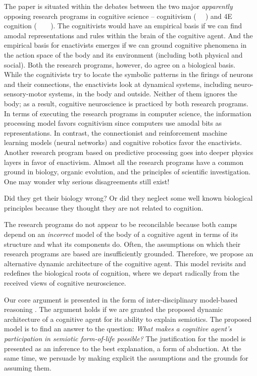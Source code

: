 The paper is situated within the debates between the two major \textit{apparently} opposing research programs in cognitive science – cognitivism (\cite{chomsky}~ \cite{fodor_modularity_1983}~\cite{pinker}) and 4E cognition (\cite{gibson1991ecological}~\cite{Merleau-Ponty2013-vs}~\cite{varela}~\cite{maturana1991autopoiesis}~\cite{noe_action_2004}). The cognitivists would have an empirical basis if we can find amodal representations and rules within the brain of the cognitive agent. And the empirical basis for enactivists emerges if we can ground cognitive phenomena in the action space of the body and its environment (including both physical and social). Both the research programs, however, do agree on a biological basis. While the cognitivists try to locate the symbolic patterns in the firings of neurons and their connections, the enactivists look at dynamical systems, including neuro-sensory-motor systems, in the body and outside. Neither of them ignores the body; as a result, cognitive neuroscience is practiced by both research programs. In terms of executing the research programs in computer science, the information processing model favors cognitivism since computers use amodal bits as representations. In contrast, the connectionist and reinforcement machine learning models (neural networks) and cognitive robotics favor the enactivists.
Another research program based on predictive processing goes into deeper physics layers in favor of enactivism. Almost all the research programs have a common ground in biology, organic evolution, and the principles of scientific investigation. One may wonder why serious disagreements still exist! 

Did they get their biology wrong? Or did they neglect some well known biological principles because they thought they are not related to cognition. 

The research programs do not appear to be reconcilable because both camps depend on an \textit{incorrect} model of the body of a cognitive agent in terms of its structure and what its components do.  Often, the assumptions on which their research programs are based are insufficiently grounded. Therefore, we propose an alternative dynamic architecture of the cognitive agent. This model revisits and redefines the biological roots of cognition, where we depart radically from the received views of cognitive neuroscience. 

Our core argument is presented in the form of inter-disciplinary model-based reasoning\cite{Nersessian_2002} \cite{nancy2022}. The argument holds if we are granted the proposed dynamic architecture of a cognitive agent for its ability to explain semiotics.  The proposed model is to find an answer to the question: \textit{What makes a cognitive agent's participation in semiotic form-of-life possible?} The justification for the model is presented as an inference to the best explanation, a form of abduction.\cite{lipton2017inference}  At the same time, we persuade by making explicit the assumptions and the grounds for assuming them. 


